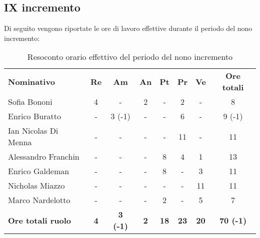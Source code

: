 \documentclass[../piano-di-progetto.tex]{subfiles}
\begin{document}
\subsection{IX incremento}

Di seguito vengono riportate le ore di lavoro effettive durante il periodo del nono incremento:
\begin{table}[H]
    \centering
    \begin{tabular}{lccccccc}
      \rowcolor{lightgray}
      \textbf{Nominativo}       & \textbf{Re}      & \textbf{Am} & \textbf{An}      & \textbf{Pt} & \textbf{Pr} & \textbf{Ve} & \textbf{Ore totali} \\
Sofia Bononi              & 4          & -                & 2          & -           & 2           & -           & 8                \\
Enrico Buratto            & -          & 3 (-1)                & -          & -           & 6           & -           & 9 (-1)           \\
Ian Nicolas Di Menna      & -          & -                & -          & -           & 11          & -           & 11               \\
Alessandro Franchin       & -          & -                & -          & 8           & 4           & 1           & 13               \\
Enrico Galdeman           & -          & -                & -          & 8           & -           & 3           & 11               \\
Nicholas Miazzo           & -          & -                & -          & -           & -           & 11          & 11               \\
Marco Nardelotto          & -          & -                & -          & 2           & -           & 5           & 7                \\
\textbf{Ore totali ruolo} & \textbf{4} & \textbf{3  (-1)} & \textbf{2} & \textbf{18} & \textbf{23} & \textbf{20} & \textbf{70 (-1)}

    \end{tabular}
    \caption{Resoconto orario effettivo del periodo del nono incremento}
  \end{table}
\end{document}

